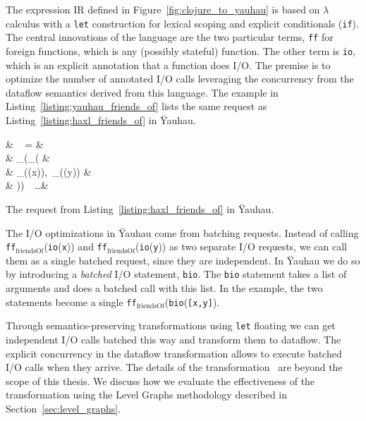 The expression \ac{IR} defined in Figure~\ref{fig:clojure_to_yauhau} is based on $\lambda$ calculus with a \texttt{let} construction for lexical scoping and explicit conditionals (\texttt{if}).
The central innovations of the language are the two particular terms, \texttt{ff} for foreign functions, which is any (possibly stateful) function.
The other term is \texttt{io}, which is an explicit annotation that a function does \ac{I/O}.
The premise is to optimize the number of annotated \ac{I/O} calls leveraging the concurrency from the dataflow semantics derived from this language.
The example in Listing~\ref{listing:yauhau_friends_of} lists the same request as Listing~\ref{listing:haxl_friends_of} in \"{Y}auhau.

\begin{listing}
\begin{flalign*}
& ~ = & \\ 
& \quad {}_(_( & \\ 
& \quad \quad {}_((x)),~_((y)) & \\
& \quad ))~~\ldots & 
\end{flalign*}
\caption{The request from Listing~\ref{listing:haxl_friends_of} in \"{Y}auhau.}
\label{listing:yauhau_friends_of}
\end{listing}

The \ac{I/O} optimizations in \"{Y}auhau come from batching requests.
Instead of calling \texttt{ff}$_\text{friendsOf}$(\texttt{io}(\texttt{x})) and \texttt{ff}$_\text{friendsOf}$(\texttt{io}(\texttt{y})) as two separate \ac{I/O} requests, we can call them as a single batched request, since they are independent.
In \"{Y}auhau we do so by introducing a \emph{batched} \ac{I/O} statement, \texttt{bio}.
The \texttt{bio} statement takes a list of arguments and does a batched call with this list.
In the example, the two statements become a single \texttt{ff}$_\text{friendsOf}$(\texttt{bio}(\texttt{[x,y]}).

Through semantics-preserving transformations using \texttt{let} floating we can get independent \ac{I/O} calls batched this way and transform them to dataflow.
The explicit concurrency in the dataflow transformation allows to execute batched \ac{I/O} calls when they arrive.
The details of the transformation~\cite{ertel_cc18} are beyond the scope of this thesis.
We discuss how we evaluate the effectiveness of the transformation using the Level Graphs methodology described in Section~\ref{sec:level_graphs}.


